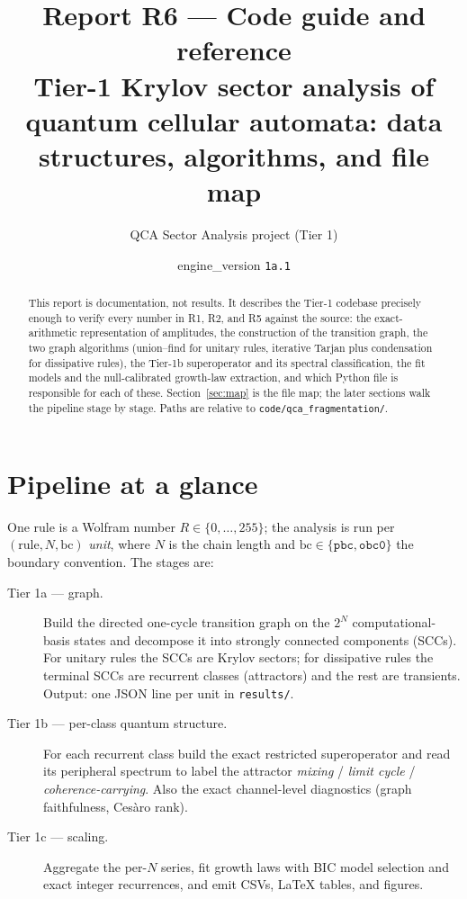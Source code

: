 \documentclass[11pt]{article}
\title{\textbf{Report R6 --- Code guide and reference}\\
\large Tier-1 Krylov sector analysis of quantum cellular automata:
data structures, algorithms, and file map}
\author{QCA Sector Analysis project (Tier 1)}
\date{engine\_version \texttt{1a.1}}
\newcommand{\rt}[1]{\texttt{#1}}
\newcommand{\pf}[1]{\texttt{#1}}          %
\begin{document}
\maketitle

\begin{abstract}
This report is documentation, not results. It describes the Tier-1 codebase
precisely enough to verify every number in R1, R2, and R5 against the source:
the exact-arithmetic representation of amplitudes, the construction of the
transition graph, the two graph algorithms (union--find for unitary rules,
iterative Tarjan plus condensation for dissipative rules), the Tier-1b
superoperator and its spectral classification, the fit models and the
null-calibrated growth-law extraction, and which Python file is responsible for
each of these. Section~\ref{sec:map} is the file map; the later sections walk
the pipeline stage by stage. Paths are relative to \pf{code/qca\_fragmentation/}.
\end{abstract}

\tableofcontents

\section{Pipeline at a glance}
\label{sec:pipeline}
One rule is a Wolfram number $R\in\{0,\dots,255\}$; the analysis is run per
$(\text{rule},N,\text{bc})$ \emph{unit}, where $N$ is the chain length and
$\text{bc}\in\{\rt{pbc},\rt{obc0}\}$ the boundary convention. The stages are:

\begin{description}
\item[Tier 1a --- graph.] Build the directed one-cycle transition graph on the
  $2^N$ computational-basis states and decompose it into strongly connected
  components (SCCs). For unitary rules the SCCs are Krylov sectors; for
  dissipative rules the terminal SCCs are recurrent classes (attractors) and the
  rest are transients. Output: one JSON line per unit in \pf{results/}.
\item[Tier 1b --- per-class quantum structure.] For each recurrent class build
  the exact restricted superoperator and read its peripheral spectrum to label
  the attractor \emph{mixing} / \emph{limit cycle} / \emph{coherence-carrying}.
  Also the exact channel-level diagnostics (graph faithfulness, Ces\`aro rank).
\item[Tier 1c --- scaling.] Aggregate the per-$N$ series, fit growth laws with
  BIC model selection and exact integer recurrences, and emit CSVs, LaTeX
  tables, and figures.
\end{description}
\end{document}
